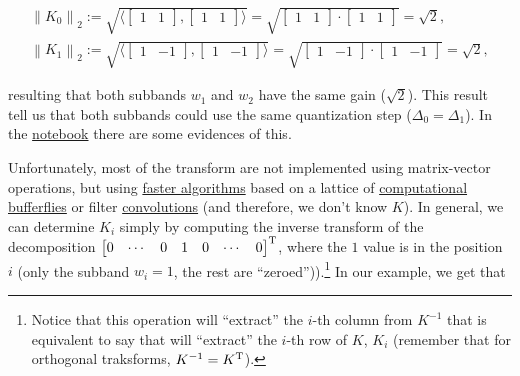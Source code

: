 \begin{equation}
  \begin{array}{l}
    \left\| K_0 \right\|_2 := \sqrt{\langle \begin{bmatrix}1 & 1\end{bmatrix}, \begin{bmatrix}1 & 1\end{bmatrix} \rangle} = \sqrt{\begin{bmatrix}1 & 1\end{bmatrix} \cdot \begin{bmatrix}1 & 1\end{bmatrix}} = \sqrt{2},\\
    \left\| K_1 \right\|_2 := \sqrt{\langle \begin{bmatrix}1 & -1\end{bmatrix}, \begin{bmatrix}1 & -1\end{bmatrix} \rangle} = \sqrt{\begin{bmatrix}1 & -1\end{bmatrix}\cdot \begin{bmatrix}1 & -1\end{bmatrix}} = \sqrt{2},
  \end{array}
\end{equation}

resulting that both subbands $w_1$ and $w_2$ have the same gain
($\sqrt{2}$). This result tell us that both subbands could use the
same quantization step ($\Delta_0=\Delta_1$). In the
\href{https://github.com/Tecnologias-multimedia/intercom/blob/master/docs/stereo_transforms_RD.ipynb}{notebook}
there are some evidences of this.

Unfortunately, most of the transform are not implemented using
matrix-vector operations, but using
\href{https://en.wikipedia.org/wiki/Fast_Fourier_transform}{faster
  algorithms} based on a lattice of
\href{https://en.wikipedia.org/wiki/Butterfly_diagram}{computational
  bufferflies} or filter
\href{https://en.wikipedia.org/wiki/Filter_(signal_processing)}{convolutions}
(and therefore, we don't know $K$). In general, we can determine $K_i$
simply by computing the inverse transform of the decomposition
$\begin{bmatrix} 0 & \cdots & 0 & 1 & 0 & \cdots &
  0 \end{bmatrix}^{\text T}$, where the $1$ value is in the position
$i$ (only the subband $w_i=1$, the rest are
``zeroed'')).\footnote{Notice that this operation will ``extract'' the
  $i$-th column from $K^{-1}$ that is equivalent to say that will
  ``extract'' the $i$-th row of $K$, $K_i$ (remember that for
  orthogonal traksforms, $K^{-1}=K^{\text T}$).} In our example, we
get that


